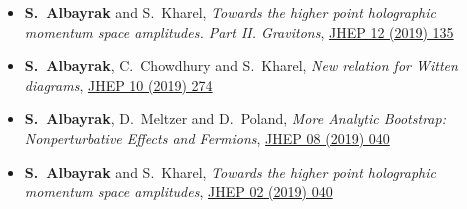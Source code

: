 \documentclass[a4paper,11pt]{article}
\begin{document}
\begin{itemize}
 \item[] {\bf S.~Albayrak} and  { S.~Kharel}, \emph{Towards the higher point holographic momentum space amplitudes. Part II. Gravitons}, \hyperref{https://inspirehep.net/files/eb148d7ad84e19945017f5ab2aa85393}{}{}{JHEP 12 (2019) 135}
 
 \item[] {\bf S.~Albayrak}, C.~Chowdhury and  { S.~Kharel}, \emph{New relation for Witten diagrams}, \hyperref{https://inspirehep.net/files/44b75a5187c14730a849c04e3b909bd3}{}{}{JHEP 10 (2019) 274}
 
 \item[] {\bf S.~Albayrak}, D.~Meltzer and  { D.~Poland}, \emph{More Analytic Bootstrap: Nonperturbative Effects and Fermions}, \hyperref{https://inspirehep.net/files/3a3c45b7b08a2948ba1c165463f00fd0}{}{}{JHEP 08 (2019) 040}
 
 \item[] {\bf S.~Albayrak} and  { S.~Kharel}, \emph{Towards the higher point holographic momentum space amplitudes}, \hyperref{https://inspirehep.net/files/fdfe40b4cfec540b04df94d4cb9bc1c4}{}{}{JHEP 02 (2019) 040}
 \end{itemize}
\end{document}
